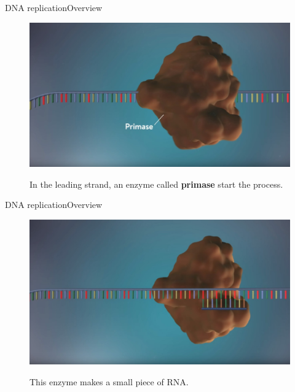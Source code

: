 \documentclass[10pt]{beamer}
\begin{document}
{%
\begin{frame}{DNA replication}{Overview}
	\begin{figure}[]
		\centering
		\includegraphics[width=\textwidth,height=0.6\textheight,keepaspectratio]{img/introduction/dna33.jpg}
		\label{img:mot2}
		\caption{In the leading strand, an enzyme called \textbf{primase} start the process.}
	\end{figure}
\end{frame}


\begin{frame}{DNA replication}{Overview}
	\begin{figure}[]
		\centering
		\includegraphics[width=\textwidth,height=0.6\textheight,keepaspectratio]{img/introduction/dna34.jpg}
		\label{img:mot2}
		\caption{This enzyme makes a small piece of RNA.}
	\end{figure}
\end{frame}

}
\end{document}
